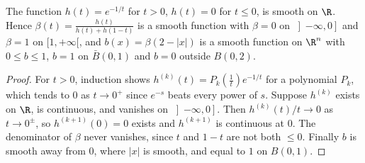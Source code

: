 \begin{lemma}\label{lem:bump}
The function $h(t)=e^{-1/t}$ for $t>0$, $h(t)=0$ for $t\le0$, is smooth on $\R$. Hence $\beta(t)=\frac{h(t)}{h(t)+h(1-t)}$ is a smooth function with
$\beta=0$ on $\left]-\infty,0\right]$ and $\beta=1$ on $[1,+\infty[$, and $b(x)=\beta(2-|x|)$ is a smooth function on $\R^n$ with $0\le b\le1$, $b=1$ on
$\bar B(0,1)$ and $b=0$ outside $B(0,2)$.
\end{lemma}
\begin{proof}
For $t>0$, induction shows $h^{(k)}(t)=P_k(\frac1t)e^{-1/t}$ for a polynomial $P_k$, which tends to $0$ as $t\to0^+$ since $e^{-s}$ beats every power of $s$.
Suppose $h^{(k)}$ exists on $\R$, is continuous, and vanishes on $\left]-\infty,0\right]$. Then $h^{(k)}(t)/t\to0$ as $t\to0^\pm$, so $h^{(k+1)}(0)=0$ exists and
$h^{(k+1)}$ is continuous at $0$. The denominator of $\beta$ never vanishes, since $t$ and $1-t$ are not both $\le0$. Finally $b$ is smooth away from $0$,
where $|x|$ is smooth, and equal to $1$ on $B(0,1)$.
\end{proof}


